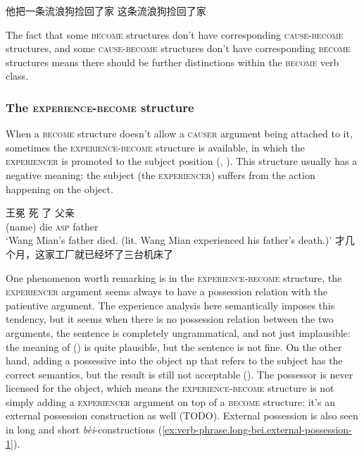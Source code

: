 \documentclass[UTF8, a4paper, oneside, scheme=plain, 12pt]{ctexrep}
\newcommand{\form}[1]{\emph{#1}}
\newcommand{\translate}[1]{`#1'}
\newcommand*{\category}[1]{\textsc{#1}}
\begin{document}
\begin{exe}
    \ex 他把一条流浪狗捡回了家
    \ex *这条流浪狗捡回了家
\end{exe}

The fact that some \category{become} structures 
don't have corresponding \category{cause}-\category{become} structures,
and some \category{cause}-\category{become} structures 
don't have corresponding \category{become} structures
means there should be further distinctions 
within the \category{become} verb class.

\subsubsection{The \category{experience}-\category{become} structure}\label{sec:verb-phrase.experience}

When a \category{become} structure
doesn't allow a \category{causer} argument being attached to it,
sometimes the \category{experience}-\category{become} structure is available,
in which the \category{experiencer} is promoted to the subject position
(,
).
This structure usually has a negative meaning:
the subject (the \category{experiencer}) suffers from the action happening on the object.

\begin{exe}
    \ex\label{ex:verb-phrase.experience.1} \gll 王冕 死 了 父亲 \\
    (name) die \category{asp} father \\
    \glt \translate{Wang Mian's father died.
    (lit. Wang Mian experienced his father's death.)}
    \ex\label{ex:verb-phrase.experience.2} 才几个月，这家工厂就已经坏了三台机床了
\end{exe}

One phenomenon worth remarking 
is in the \category{experience}-\category{become} structure,
the \category{experiencer} argument 
seems always to have a possession relation 
with the patientive argument.
The experience analysis here semantically
imposes this tendency,
but it seems when there is no possession relation between the two arguments, 
the sentence is completely ungrammatical,
and not just implausible:
the meaning of ()
is quite plausible,
but the sentence is not fine.
On the other hand, 
adding a possessive into the object \acs{np}
that refers to the subject 
has the correct semantics,
but the result is still not acceptable
().
The possessor is never licensed for the object,
which means the \category{experience}-\category{become} structure 
is not simply adding a \category{experiencer} argument 
on top of a \category{become} structure:
it's an external possession construction as well (TODO).
External possession is also seen in 
long and short \form{bèi}-constructions
(\ref{ex:verb-phrase.long-bei.external-possession-1}).
\end{document}
